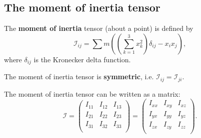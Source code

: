 \documentclass[12pt, a4paper]{article}
\begin{document}

\subsection{The moment of inertia tensor}



\begin{definition}
    The \textbf{moment of inertia} tensor (about a point) is defined by
    \[\mathcal{I}_{ij}=\sum m \left( \left( \sum_{k=1}^3 x^2_k \right) \delta_{ij} -x_ix_j \right),\]
    where \(\delta_{ij}\) is the Kronecker delta function.
\end{definition}

\begin{mdremark}
    The moment of inertia tensor is \textbf{symmetric}, i.e. \(\mathcal{I}_{ij}=\mathcal{I}_{ji}\).
\end{mdremark}

\begin{theorem}
    The moment of inertia tensor can be written as a matrix:
    \[\mathcal{I}= \begin{pmatrix}
        I_{11} & I_{12} & I_{13} \\
        I_{21} & I_{22} & I_{23} \\
        I_{31} & I_{32} & I_{33} \\
    \end{pmatrix} = \begin{pmatrix}
        I_{xx} & I_{xy} & I_{xz} \\
        I_{yx} & I_{yy} & I_{yz} \\
        I_{zx} & I_{zy} & I_{zz} \\
    \end{pmatrix}.\]
\end{theorem}
\end{document}
